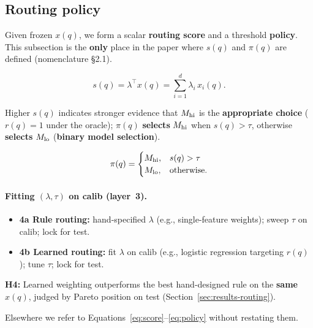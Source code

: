 \subsection{Routing policy}
\label{sec:routing-policy}

Given frozen $x(q)$, we form a scalar \textbf{routing score} and a threshold \textbf{policy}.
This subsection is the \textbf{only} place in the paper where $s(q)$ and $\pi(q)$ are defined (nomenclature §2.1).

\begin{equation}
  s(q) = \lambda^\top x(q) = \sum_{i=1}^{d} \lambda_i\, x_i(q).
  \label{eq:score}
\end{equation}

Higher $s(q)$ indicates stronger evidence that $M_{\mathrm{hi}}$ is the \textbf{appropriate choice} ($r(q)=1$ under the oracle); $\pi(q)$ \textbf{selects} $M_{\mathrm{hi}}$ when $s(q) > \tau$, otherwise \textbf{selects} $M_{\mathrm{lo}}$ (\textbf{binary model selection}).

\begin{equation}
  \pi(q) =
  \begin{cases}
    M_{\mathrm{hi}}, & s(q) > \tau \\
    M_{\mathrm{lo}}, & \text{otherwise.}
  \end{cases}
  \label{eq:policy}
\end{equation}

\paragraph{Fitting $(\lambda,\tau)$ on calib (layer~3).}
\begin{itemize}
  \item \textbf{4a Rule routing:} hand-specified $\lambda$ (e.g., single-feature weights); sweep $\tau$ on calib; lock for test.
  \item \textbf{4b Learned routing:} fit $\lambda$ on calib (e.g., logistic regression targeting $r(q)$); tune $\tau$; lock for test.
\end{itemize}

\textbf{H4:} Learned weighting outperforms the best hand-designed rule on the \textbf{same} $x(q)$, judged by Pareto position on test (Section~\ref{sec:results-routing}).

Elsewhere we refer to Equations~\eqref{eq:score}--\eqref{eq:policy} without restating them.
